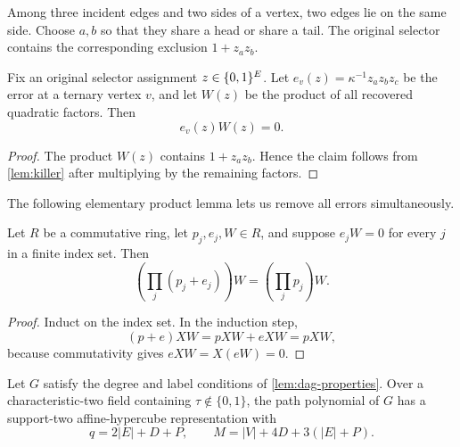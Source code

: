 Among three incident edges and two sides of a vertex, two edges lie on the same side.
Choose \(a,b\) so that they share a head or share a tail.  The original selector contains
the corresponding exclusion \(1+z_az_b\).

\begin{lemma}\label{lem:local-cancel}
Fix an original selector assignment \(z\in\{0,1\}^E\).  Let \(e_v(z)=\kappa^{-1}z_az_bz_c\) be
the error at a ternary vertex \(v\), and let \(W(z)\) be the product of all recovered
quadratic factors.  Then
\[
  e_v(z)W(z)=0.
\]
\end{lemma}

\begin{proof}
The product \(W(z)\) contains \(1+z_az_b\).  Hence the claim follows from
\cref{lem:killer} after multiplying by the remaining factors.
\end{proof}

The following elementary product lemma lets us remove all errors simultaneously.

\begin{lemma}\label{lem:prod-errors}
Let \(R\) be a commutative ring, let \(p_j,e_j,W\in R\), and suppose
\(e_jW=0\) for every \(j\) in a finite index set.  Then
\[
  \left(\prod_j(p_j+e_j)\right)W
  =\left(\prod_jp_j\right)W.
\]
\end{lemma}

\begin{proof}
Induct on the index set.  In the induction step,
\[
 (p+e)XW=pXW+eXW=pXW,
\]
because commutativity gives \(eXW=X(eW)=0\).
\end{proof}

\begin{theorem}\label{thm:graph-compiler}
Let \(G\) satisfy the degree and label conditions of \cref{lem:dag-properties}.  Over a
characteristic-two field containing \(\tau\notin\{0,1\}\), the path polynomial of \(G\)
has a support-two affine-hypercube representation with
\[
 q=2|E|+D+P,
 \qquad
 M=|V|+4D+3(|E|+P).
\]
\end{theorem}

